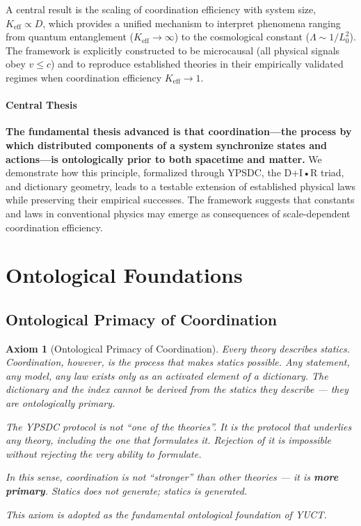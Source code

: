 \documentclass[11pt,a4paper]{article}
\newtheorem{axiom}{Axiom}
\begin{document}
A central result is the scaling of coordination efficiency with system size, \(K_{\mathrm{eff}} \propto D\), which provides a unified mechanism to interpret phenomena ranging from quantum entanglement (\(K_{\mathrm{eff}} \to \infty\)) to the cosmological constant (\(\Lambda \sim 1/L_0^2\)). The framework is explicitly constructed to be microcausal (all physical signals obey \(v \leq c\)) and to reproduce established theories in their empirically validated regimes when coordination efficiency \(K_{\mathrm{eff}} \to 1\).

\paragraph{Central Thesis}
\textbf{The fundamental thesis advanced is that coordination---the process by which distributed components of a system synchronize states and actions---is ontologically prior to both spacetime and matter.} We demonstrate how this principle, formalized through YPSDC, the D+I•R triad, and dictionary geometry, leads to a testable extension of established physical laws while preserving their empirical successes. The framework suggests that constants and laws in conventional physics may emerge as consequences of scale-dependent coordination efficiency.


\section{Ontological Foundations}
\label{sec:ontological-foundations}

\subsection{Ontological Primacy of Coordination}
\begin{axiom}[Ontological Primacy of Coordination]
	Every theory describes statics. Coordination, however, is the process that makes statics possible.
	Any statement, any model, any law exists only as an activated element of a dictionary.
	The dictionary and the index cannot be derived from the statics they describe — they are ontologically primary.
	
	The YPSDC protocol is not ``one of the theories''.
	It is the protocol that underlies any theory, including the one that formulates it.
	Rejection of it is impossible without rejecting the very ability to formulate.
	
	In this sense, coordination is not ``stronger'' than other theories — it is \textbf{more primary}.
	Statics does not generate; statics is generated.
	
	This axiom is adopted as the fundamental ontological foundation of YUCT.
\end{axiom}
\end{document}
